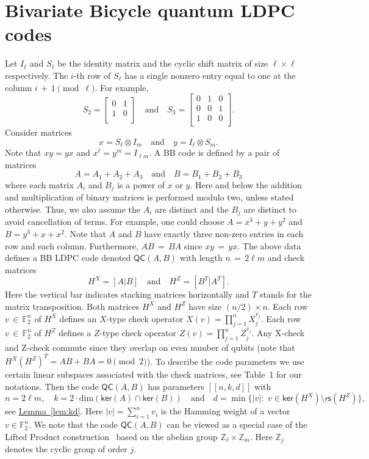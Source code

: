 \documentclass{article}
\newcommand{\be}{\begin{equation}}
\newcommand{\ee}{\end{equation}}
\newcommand{\ba}{\begin{array}}
\newcommand{\ea}{\end{array}}
\newcommand{\FF}{\mathbb{F}}
\newcommand{\ZZ}{\mathbb{Z}}
\newcommand{\rs}[1]{\mathsf{rs}{(#1)}}
\renewcommand{\ker}[1]{\mathsf{ker}{(#1)}}
\newcommand{\qc}{\mathsf{QC}(A,B)}
\newcommand{\lem}[1]{\hyperref[lem:#1]{Lemma~\ref*{lem:#1}}}
\begin{document}
\section{Bivariate Bicycle quantum LDPC codes}\label{sec:codedefinition}

Let $I_\ell$ and $S_\ell$ be the identity matrix and the cyclic shift matrix of size $\ell \times \ell$
respectively.
The $i$-th row of $S_\ell$ has a single nonzero entry equal to one at the column $i\,{+}\,1{\pmod \ell}$.
For example,
\[
S_2=\left[\ba{cc} 0 & 1 \\ 1 & 0 \\ \ea\right] \quad \mbox{and} \quad
S_3= \left[\ba{ccc} 0 & 1 & 0 \\ 0 & 0 & 1 \\ 1 & 0 & 0 \\ \ea \right].
\]
Consider matrices
\[
x=S_\ell \otimes I_m \quad \mbox{and} \quad y = I_\ell \otimes S_m.
\]
Note that $xy=yx$ and $x^\ell = y^m =I_{\ell m}$.
A BB code is defined by a pair of matrices
\be
\label{AB}
A = A_1 + A_2 + A_3  \quad \mbox{and} \quad B = B_1+B_2+B_3
\ee
where each matrix $A_i$ and $B_j$ is a power of $x$ or $y$. Here and below the addition and multiplication of binary matrices is performed modulo two, unless stated otherwise. Thus, we also assume the $A_i$ are distinct and the $B_j$ are distinct to avoid cancellation of terms. For example,
one could choose $A=x^3+y+y^2$ and $B=y^3+x+x^2$.
Note that $A$ and $B$ have exactly three non-zero entries in each row and each column. Furthermore, $AB\,{=}\,BA$ since $xy\,{=}\,yx$.
The above data defines a
BB LDPC code denoted $\qc$ with 
length $n\,{=}\,2\ell m$  and 
 check matrices
\be
\label{HXHZ}
H^X = \left[A | B\right] \quad \mbox{and} \quad  H^Z=\left[B^T | A^T\right].
\ee
Here the vertical bar indicates stacking matrices
horizontally and $T$ stands for the matrix transposition. 
Both matrices $H^X$ and $H^Z$ have size $(n/2){\times} n$.
Each row $v\,{\in}\, \FF_2^n$ of $H^X$ defines an $X$-type check operator $X(v)=\prod_{j=1}^n X_j^{v_j}$.
Each row $v\,{\in}\, \FF_2^n$ of $H^Z$ defines a $Z$-type check operator $Z(v)=\prod_{j=1}^n Z_j^{v_j}$.
Any X-check and Z-check commute since they overlap on even number of qubits (note that $H^X (H^Z)^T = AB+BA=0 {\pmod 2}$).
To describe the code parameters we use certain linear subspaces associated with the check matrices, see Table~1 for our notations.
Then the code $\qc$ has parameters $[[n,k,d]]$ with 
\be
n=2\ell m,\quad 
k = 2\cdot\mathrm{dim}\left(\ker{A} \cap \ker{B}\right)
\quad \mbox{and} \quad
d= \min\bigl\{ |v|{:} \,\, v\in \ker{H^X}{\setminus} \rs{H^Z} \bigr\},
\ee
see \lem{kd}.
Here $|v|=\sum_{i=1}^n v_i$ is the Hamming weight of a vector $v\in \FF_2^n$.
We note that the code $\qc$ can be viewed as a special case of the Lifted Product construction~\cite{panteleev2021quantum}
based on the abelian group $\ZZ_\ell \times \ZZ_m$.
Here $\ZZ_j$ denotes the cyclic group of order $j$.
\end{document}

